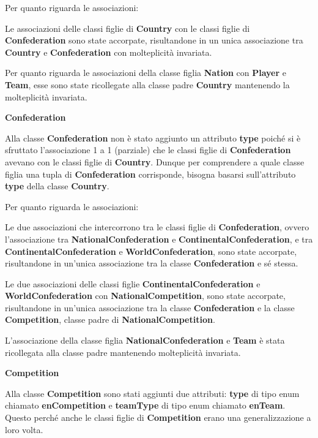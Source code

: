Per quanto riguarda le associazioni:

Le associazioni delle classi figlie di \textbf{Country} con 
le classi figlie di \textbf{Confederation} sono state 
accorpate, risultandone in un unica associazione tra 
\textbf{Country} e \textbf{Confederation} con molteplicità 
invariata.

Per quanto riguarda le associazioni della classe figlia 
\textbf{Nation} con \textbf{Player} e \textbf{Team}, esse 
sono state ricollegate alla classe padre \textbf{Country} 
mantenendo la molteplicità invariata.

\bigskip
\textbf{Confederation}
\bigskip

Alla classe \textbf{Confederation}  non è stato aggiunto un 
attributo \textbf{type} poiché si è sfruttato l'associazione 
1 a 1 (parziale) che le classi figlie di \textbf{Confederation}
avevano con le classi figlie di \textbf{Country}.
Dunque per comprendere a quale classe figlia una tupla di 
\textbf{Confederation} corrisponde, bisogna basarsi 
sull'attributo \textbf{type} della classe \textbf{Country}.

Per quanto riguarda le associazioni:

Le due associazioni che intercorrono tra le classi figlie di 
\textbf{Confederation}, ovvero l'associazione tra 
\textbf{NationalConfederation} e 
\textbf{ContinentalConfederation}, e tra 
\textbf{ContinentalConfederation} e 
\textbf{WorldConfederation}, sono state accorpate, 
risultandone in un'unica associazione tra la classe 
\textbf{Confederation} e sé stessa.

Le due associazioni delle classi figlie 
\textbf{ContinentalConfederation} e 
\textbf{WorldConfederation} con \textbf{NationalCompetition}, 
sono state accorpate, risultandone in un'unica associazione 
tra la classe \textbf{Confederation} e la classe 
\textbf{Competition}, classe padre di 
\textbf{NationalCompetition}.

L'associazione della classe figlia \textbf{NationalConfederation} e
\textbf{Team} è stata ricollegata alla classe padre mantenendo
molteplicità invariata.

\newpage
\textbf{Competition}
\bigskip

Alla classe \textbf{Competition} sono stati aggiunti due 
attributi: \textbf{type} di tipo enum chiamato 
\textbf{enCompetition} e \textbf{teamType} di tipo enum 
chiamato \textbf{enTeam}. Questo perché anche le classi 
figlie di \textbf{Competition} erano una generalizzazione a 
loro volta.


